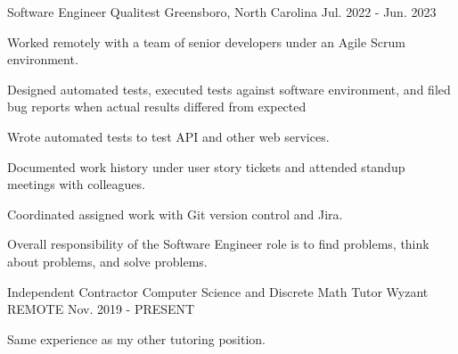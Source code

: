 

\begin{cventries}
  \cventry
    {Software Engineer} %
    {Qualitest} %
    {Greensboro, North Carolina} %
    {Jul. 2022 - Jun. 2023} %
	{
		\begin{cvitems}
      \item {Worked remotely with a team of senior developers under an Agile Scrum environment.}
      \item {Designed automated tests, executed tests against software environment, and filed bug reports when actual results differed from expected}
      \item {Wrote automated tests to test API and other web services.}
      \item {Documented work history under user story tickets and attended standup meetings with colleagues.}
      \item {Coordinated assigned work with Git version control and Jira.}
      \item {Overall responsibility of the Software Engineer role is to find problems, think about problems, and solve problems.}
		\end{cvitems}
	}

  \cventry
    {Independent Contractor Computer Science and Discrete Math Tutor} %
    {Wyzant} %
    {REMOTE} %
    {Nov. 2019 - PRESENT} %
    {
    	\begin{cvitems}
			\item {Same experience as my other tutoring position.}
		\end{cvitems}
    }
    

\end{cventries}
